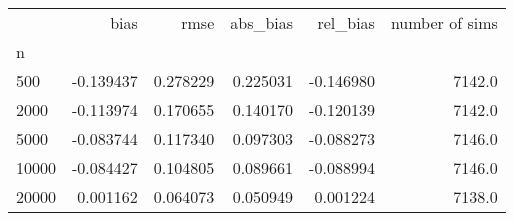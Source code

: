 \begin{tabular}{lrrrrr}
\toprule
{} &      bias &      rmse &  abs_bias &  rel_bias &  number of sims \\
n     &           &           &           &           &                 \\
\midrule
500   & -0.139437 &  0.278229 &  0.225031 & -0.146980 &          7142.0 \\
2000  & -0.113974 &  0.170655 &  0.140170 & -0.120139 &          7142.0 \\
5000  & -0.083744 &  0.117340 &  0.097303 & -0.088273 &          7146.0 \\
10000 & -0.084427 &  0.104805 &  0.089661 & -0.088994 &          7146.0 \\
20000 &  0.001162 &  0.064073 &  0.050949 &  0.001224 &          7138.0 \\
\bottomrule
\end{tabular}
